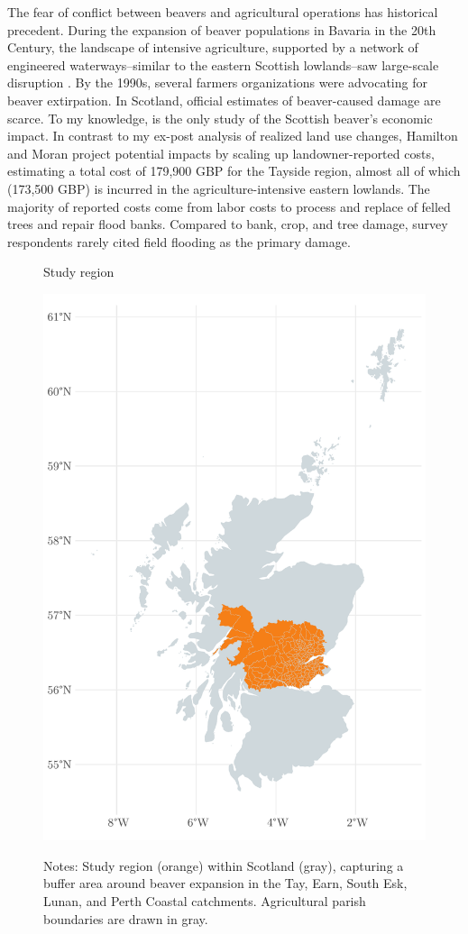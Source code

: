 The fear of conflict between beavers and agricultural operations has historical precedent. During the expansion of beaver populations in Bavaria in the 20th Century, the landscape of intensive agriculture, supported by a network of engineered waterways--similar to the eastern Scottish lowlands--saw large-scale disruption \citep{campbell-palmer_managing_2015}. By the 1990s, several farmers organizations were advocating for beaver extirpation. In Scotland, official estimates of beaver-caused damage are scarce. To my knowledge, \textcite{hamilton_tayside_2015} is the only study of the Scottish beaver's economic impact. In contrast to my ex-post analysis of realized land use changes, Hamilton and Moran project potential impacts by scaling up landowner-reported costs, estimating a total cost of 179,900 GBP for the Tayside region, almost all of which (173,500 GBP) is incurred in the agriculture-intensive eastern lowlands. The majority of reported costs come from labor costs to process and replace of felled trees and repair flood banks. Compared to bank, crop, and tree damage, survey respondents rarely cited field flooding as the primary damage.

\begin{figure}
    \centering
    \caption{Study region}
    \includegraphics[width=0.4\linewidth]{output/figures/study_area.pdf}
    \label{fig:study-area}
    \caption*{\justifying \footnotesize Notes: Study region (orange) within Scotland (gray), capturing a buffer area around beaver expansion in the Tay, Earn, South Esk, Lunan, and Perth Coastal catchments. Agricultural parish boundaries are drawn in gray.}
\end{figure}